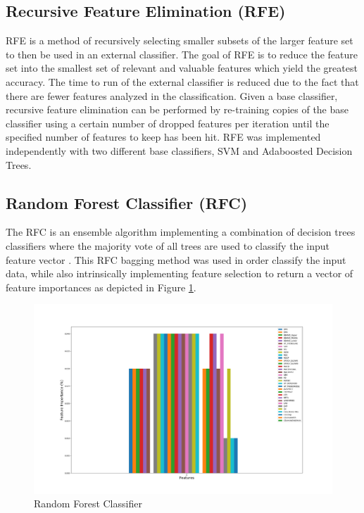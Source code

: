 \documentclass{article}
\begin{document}
\subsection{Recursive Feature Elimination (RFE)}
RFE is a method of recursively selecting smaller subsets of the larger feature set to then be used in an external classifier. The goal of RFE is to reduce the feature set into the smallest set of relevant and valuable features which yield the greatest accuracy. The time to run of the external classifier is reduced due to the fact that there are fewer features analyzed in the classification.
Given a base classifier, recursive feature elimination can be performed by re-training copies of the base classifier using a certain number of dropped features per iteration until the specified number of features to keep has been hit. RFE was implemented independently with two different base classifiers, SVM and Adaboosted Decision Trees.

\subsection{\color{red}Random Forest Classifier (RFC)}
The RFC is an ensemble algorithm implementing a combination of decision trees classifiers where the majority vote of all trees are used to classify the input feature vector \cite{pal2005random}. This RFC bagging method was used in order classify the input data, while also intrinsically implementing feature selection to return a vector of feature importances as depicted in Figure \ref{fig:RFC}. 

\begin{figure}[h!]
	\centering
	\includegraphics[width=\linewidth]{data/RFC_importancesT1.png}
	\caption{Random Forest Classifier}
	\label{fig:RFC}
\end{figure}
\end{document}
